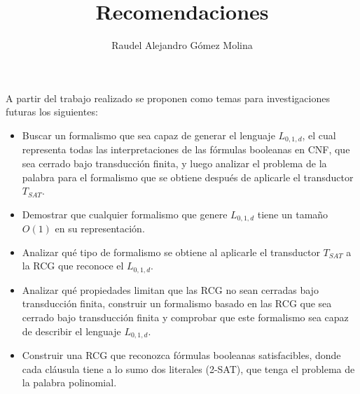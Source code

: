 \documentclass[12pt]{article}
\title{Recomendaciones}
\author{Raudel Alejandro Gómez Molina}
\begin{document}
\maketitle

A partir del trabajo realizado se proponen como temas para investigaciones futuras los
siguientes:

\begin{itemize}
    \item Buscar un formalismo que sea capaz de generar el lenguaje $L_{0,1,d}$, el cual representa todas las interpretaciones
          de las fórmulas booleanas en CNF, que sea cerrado bajo transducción finita, y luego analizar el problema de la palabra para
          el formalismo que se obtiene después de aplicarle el transductor $T_{SAT}$.
    \item Demostrar que cualquier formalismo que genere $L_{0,1,d}$ tiene un tamaño $O(1)$ en su representación.
    \item Analizar qué tipo de formalismo se obtiene al aplicarle el transductor $T_{SAT}$ a la RCG que reconoce
          el $L_{0,1,d}$.
    \item  Analizar qué propiedades limitan que las RCG no sean cerradas bajo transducción finita, construir
          un formalismo basado en las RCG que sea cerrado bajo transducción finita y comprobar que este formalismo
          sea capaz de describir el lenguaje $L_{0,1,d}$.
          \item Construir una RCG que reconozca fórmulas booleanas satisfacibles, donde cada cláusula tiene a lo sumo dos literales (2-SAT),
          que tenga el problema de la palabra polinomial.
\end{itemize}
\end{document}
